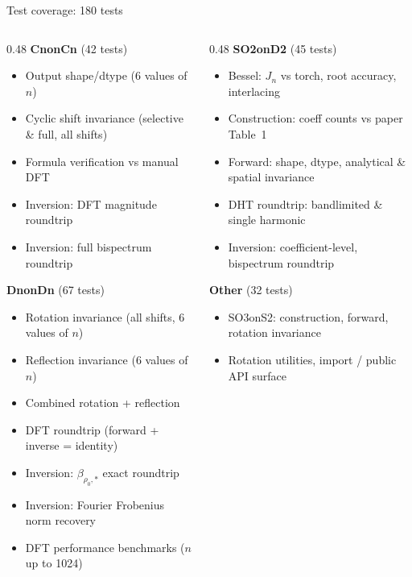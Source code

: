 \documentclass[aspectratio=169]{beamer}
\begin{document}
\begin{frame}{Test coverage: 180 tests}
  \begin{columns}[T]
    \begin{column}{0.48\textwidth}
      \textbf{CnonCn} (42 tests)
      \begin{itemize}\scriptsize
        \item Output shape/dtype (6 values of $n$)
        \item Cyclic shift invariance (selective \& full, all shifts)
        \item Formula verification vs manual DFT
        \item Inversion: DFT magnitude roundtrip
        \item Inversion: full bispectrum roundtrip
      \end{itemize}

      \bigskip

      \textbf{DnonDn} (67 tests)
      \begin{itemize}\scriptsize
        \item Rotation invariance (all shifts, 6 values of $n$)
        \item Reflection invariance (6 values of $n$)
        \item Combined rotation + reflection
        \item DFT roundtrip (forward + inverse = identity)
        \item Inversion: $\beta_{\rho_0,*}$ exact roundtrip
        \item Inversion: Fourier Frobenius norm recovery
        \item DFT performance benchmarks ($n$ up to 1024)
      \end{itemize}
    \end{column}
    \begin{column}{0.48\textwidth}
      \textbf{SO2onD2} (45 tests)
      \begin{itemize}\scriptsize
        \item Bessel: $J_n$ vs torch, root accuracy, interlacing
        \item Construction: coeff counts vs paper Table~1
        \item Forward: shape, dtype, analytical \& spatial invariance
        \item DHT roundtrip: bandlimited \& single harmonic
        \item Inversion: coefficient-level, bispectrum roundtrip
      \end{itemize}

      \bigskip

      \textbf{Other} (32 tests)
      \begin{itemize}\scriptsize
        \item SO3onS2: construction, forward, rotation invariance
        \item Rotation utilities, import / public API surface
      \end{itemize}
    \end{column}
  \end{columns}
\end{frame}
\end{document}
